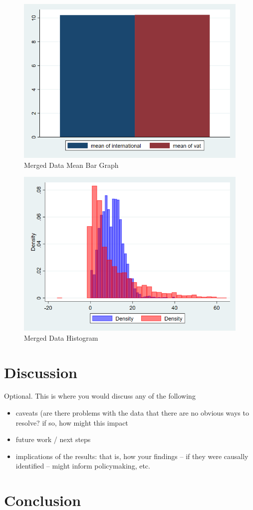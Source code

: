 \documentclass[12pt]{article}
\begin{document}
\begin{figure}
    \centering
    \includegraphics[width=0.5\linewidth]{mergedbar.png}
    \caption{Merged Data Mean Bar Graph}
    \label{fig:enter-label}
\end{figure}
\begin{figure}
    \centering
    \includegraphics[width=0.5\linewidth]{.github/mergedhistogram.png}
    \caption{Merged Data Histogram}
    \label{fig:enter-label}
\end{figure}

\section{Discussion}
\label{sec:discussion}

Optional. This is where you would discuss any of the following
\begin{itemize}
    \item caveats (are there problems with the data that there are no obvious ways to resolve? if so, how might this impact
    \item future work / next steps
    \item implications of the results: that is, how your findings -- if they were causally identified -- might inform policymaking, etc.
\end{itemize}

\section{Conclusion}
\label{sec:conclusion}
\end{document}

